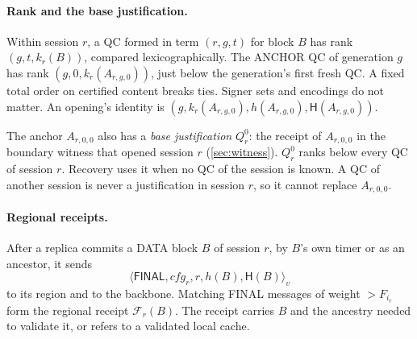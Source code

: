 \documentclass[11pt,a4paper]{article}
\newcommand{\FC}{\mathcal F}
\newcommand{\Hash}{\mathsf H}
\newcommand{\tagg}[1]{\ensuremath{\mathsf{#1}}}
\begin{document}
\paragraph{Rank and the base justification.}
Within session $r$, a QC formed in term $(r,g,t)$ for block $B$ has rank
$(g,t,k_r(B))$, compared lexicographically. The ANCHOR QC of generation
$g$ has rank $(g,0,k_r(A_{r,g,0}))$, just below the generation's first
fresh QC. A fixed total order on certified content breaks ties. Signer
sets and encodings do not matter. An opening's identity is
$(g,k_r(A_{r,g,0}),h(A_{r,g,0}),\Hash(A_{r,g,0}))$.

The anchor $A_{r,0,0}$ also has a \emph{base justification} $Q_r^0$: the
receipt of $A_{r,0,0}$ in the boundary witness that opened session $r$
(\cref{sec:witness}). $Q_r^0$ ranks below every QC of session $r$.
Recovery uses it when no QC of the session is known. A QC of another
session is never a justification in session $r$, so it cannot replace
$A_{r,0,0}$.

\paragraph{Regional receipts.}
After a replica commits a DATA block $B$ of session $r$, by $B$'s own
timer or as an ancestor, it sends
\[
 \langle\tagg{FINAL},\mathit{cfg}_r,r,h(B),\Hash(B)\rangle_v
\]
to its region and to the backbone. Matching FINAL messages of weight
$>F_{i_r}$ form the regional receipt $\FC_r(B)$. The receipt carries $B$ and the ancestry needed to validate it, or
refers to a validated local cache.
\end{document}
